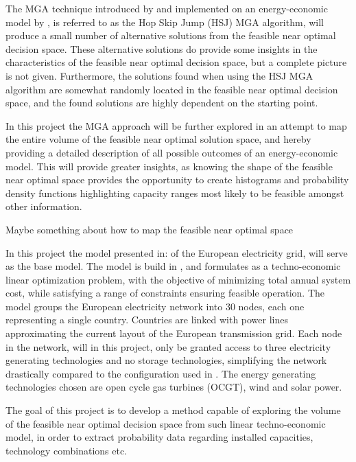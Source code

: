 The MGA technique introduced by \cite{Brill_MGA_1982} and implemented on an energy-economic model by \cite{DeCarolis_MGA}, is referred to as the Hop Skip Jump (HSJ) MGA algorithm, will produce a small number of alternative solutions from the feasible near optimal decision space.
These alternative solutions do provide some insights in the characteristics of the feasible near optimal decision space, but a complete picture is not given. Furthermore, the solutions found when using the HSJ MGA algorithm are somewhat randomly located in the feasible near optimal decision space, and the found solutions are highly dependent on the starting point. 

In this project the MGA approach will be further explored in an attempt to map the entire volume of the feasible near optimal solution space, and hereby providing a detailed description of all possible outcomes of an energy-economic model. This will provide greater insights, as knowing the shape of the feasible near optimal space provides the opportunity to create histograms and probability density functions highlighting capacity ranges most likely to be feasible amongst other information.

Maybe something about how to map the feasible near optimal space 

In this project the model presented in: \cite{PyPSA_euro_30_model} of the European electricity grid, will serve as the base model. The model is build in \cite{Pypsa}, and formulates as a techno-economic linear optimization problem, with the objective of minimizing total annual system cost, while satisfying a range of constraints ensuring feasible operation. The model groups the European electricity network into 30 nodes, each one representing a single country. Countries are linked with power lines approximating the current layout of the European transmission grid. Each node in the network, will in this project, only be granted access to three electricity generating technologies and no storage technologies, simplifying the network drastically compared to the configuration used in \cite{PyPSA_euro_30_model}. The energy generating technologies chosen are open cycle gas turbines (OCGT), wind and solar power.

The goal of this project is to develop a method capable of exploring the volume of the feasible near optimal decision space from such linear techno-economic model, in order to extract probability data regarding installed capacities, technology combinations etc. 

